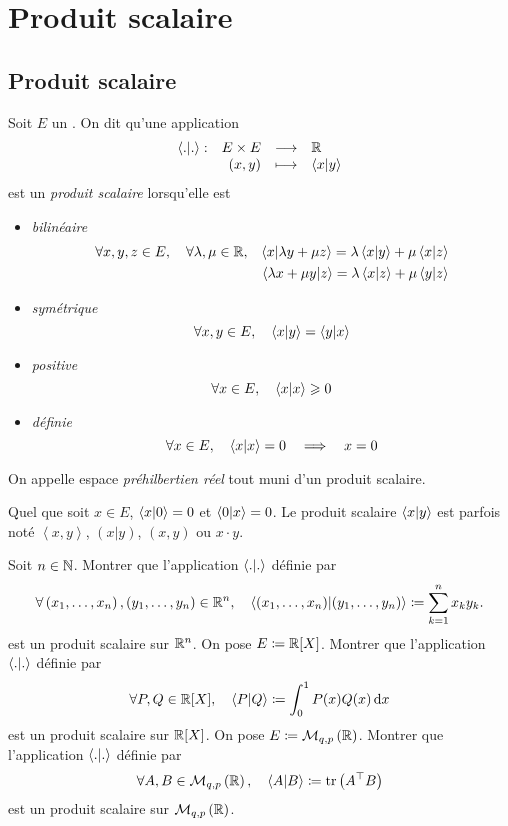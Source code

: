 \documentclass{magnolia}
\begin{document}
\magtoc

\section{Produit scalaire}
\subsection{Produit scalaire}

\begin{definition}[utile=-3]
Soit $E$ un \Rev. On dit qu'une application
\[\dspappli{\ps{.}{.}}{E\times E}{\R}{\p{x,y}}{\ps{x}{y}}\]
est un \emph{produit scalaire} lorsqu'elle est
\begin{itemize}
\item \emph{bilinéaire}
  \begin{eqnarray*}
  \forall x,y,z\in E \qsep \forall \lambda,\mu\in\R,
  &&\ps{x}{\lambda y+\mu z}=\lambda\ps{x}{y}+\mu\ps{x}{z}\\
  &&\ps{\lambda x+\mu y}{z}=\lambda\ps{x}{z}+\mu\ps{y}{z}
  \end{eqnarray*}
\item \emph{symétrique}
  \[\forall x,y\in E \qsep \ps{x}{y}=\ps{y}{x}\]
\item \emph{positive}
  \[\forall x\in E \qsep \ps{x}{x}\geq 0\]
\item \emph{définie}
  \[\forall x\in E \qsep \ps{x}{x}=0 \quad\implique\quad x=0\]
\end{itemize}
On appelle espace \emph{préhilbertien réel} tout \Rev muni d'un produit scalaire.
\end{definition}

\begin{remarques}
\remarque Quel que soit $x\in E$, $\ps{x}{0}=0$ et $\ps{0}{x}=0$.
\remarque Le produit scalaire $\ps{x}{y}$ est parfois noté $\left\langle x,y\right\rangle$, $(x|y)$,
  $(x,y)$ ou $x\cdot y$.
\end{remarques}

\begin{exos}
\exo Soit $n\in\N$. Montrer que l'application $\ps{.}{.}$ définie par
  \[\forall \p{x_1,\ldots,x_n},\p{y_1,\ldots,y_n}\in\R^n \qsep
    \ps{\p{x_1,\ldots,x_n}}{\p{y_1,\ldots,y_n}}\defeq\sum_{k=1}^n x_k y_k.\]
  est un produit scalaire sur $\R^n$.
\exo On pose $E\defeq\polyR$. Montrer que l'application $\ps{.}{.}$ définie par
  \[\forall P,Q\in\polyR \qsep \ps{P}{Q}\defeq\integ{0}{1}{P(x)Q(x)}{x}\]
  est un produit scalaire sur $\polyR$.
\exo On pose $E\defeq\mat{q,p}{\R}$. Montrer que l'application $\ps{.}{.}$ définie par
  \[\forall A,B\in\mat{q,p}{\R} \qsep \ps{A}{B}\defeq \tr\p{\trans{A}B}\]
  est un produit scalaire sur $\mat{q,p}{\R}$.
\end{exos}
\end{document}
